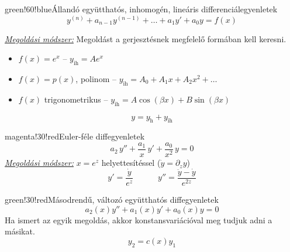 \documentclass[main.tex]{subfiles}
\begin{document}
\begin{cbox}{green!60!blue}{Állandó együtthatós, inhomogén, lineáris differenciálegyenletek}
  \[
    y^{(n)}
    + a_{n-1} y^{(n-1)}
    + \dots
    + a_1 y'
    + a_0 y
    = f(x)
  \]

  \emph{\underline{Megoldási módszer:}} \quad
  Megoldást a gerjesztésnek megfelelő
  formában kell keresni.
  \begin{itemize}
    \item $f(x) = e^x$
          \tabto{4.6cm} – \tabto{5.2cm}
          $y_\mathrm{ih} = A e^x$

    \item $f(x) = p(x)$, polinom
          \tabto{4.6cm} – \tabto{5.2cm}
          $y_\mathrm{ih} = A_0 + A_1 x + A_2 x^2 + \dots$

    \item $f(x)$ trigonometrikus
          \tabto{4.6cm} – \tabto{5.2cm}
          $y_\mathrm{ih} = A \cos (\beta x) + B \sin (\beta x)$
  \end{itemize}
  \[
    y = y_\mathrm{h} + y_\mathrm{ih}
  \]
\end{cbox}



\begin{cbox}{magenta!30!red}{Euler-féle diffegyenletek}
  \[
    a_2 \, y'' + \frac{a_1}{x} \, y' + \frac{a_0}{x^2} \, y = 0
  \]
  \emph{\underline{Megoldási módszer:}}
  \quad $x = e^z$ helyettesítéssel
  \quad ($\dot{y} = \partial_z y$)
  \[
    y'  = \frac{\dot{y}}{e^{z}}
    \quad\quad\quad
    y'' = \frac{\ddot{y} - \dot{y}}{e^{2z}}
  \]
\end{cbox}



\begin{cbox}{green!30!red}{Másodrendű, változó együtthatós diffegyenletek}
  \[
    a_2(x) y'' + a_1(x) y' + a_0(x) y = 0
  \]
  Ha ismert az egyik megoldás, akkor konstansvariációval
  meg tudjuk adni a másikat.
  \[
    y_2 = c(x) y_1
  \]
\end{cbox}
\end{document}
